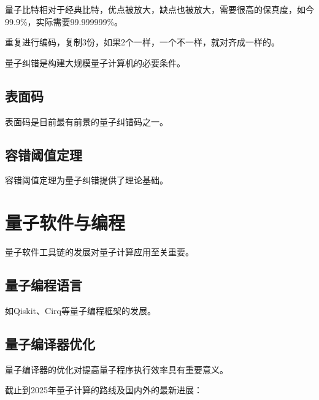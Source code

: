 \documentclass[12pt,a4paper]{article}
\begin{document}
量子比特相对于经典比特，优点被放大，缺点也被放大，需要很高的保真度，如今99.9\%，实际需要99.999999\%。

重复进行编码，复制3份，如果2个一样，一个不一样，就对齐成一样的。

量子纠错是构建大规模量子计算机的必要条件。

\subsection{表面码}
表面码是目前最有前景的量子纠错码之一。

\subsection{容错阈值定理}
容错阈值定理为量子纠错提供了理论基础。

\section{量子软件与编程}
量子软件工具链的发展对量子计算应用至关重要。

\subsection{量子编程语言}
如Qiskit、Cirq等量子编程框架的发展。

\subsection{量子编译器优化}
量子编译器的优化对提高量子程序执行效率具有重要意义。

截止到2025年量子计算的路线及国内外的最新进展：
\end{document}
